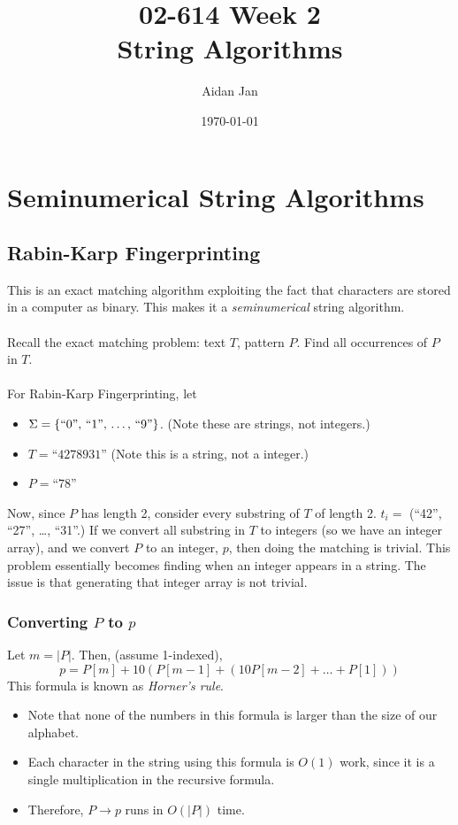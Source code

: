 \documentclass[10pt]{article}
\title{02-614 Week 2 \\ \large{String Algorithms}}
\author{Aidan Jan}
\date{\today}
\begin{document}
\maketitle

\section*{Seminumerical String Algorithms}
\subsection*{Rabin-Karp Fingerprinting}
This is an exact matching algorithm exploiting the fact that characters are stored in a computer as binary.  This makes it a \textit{seminumerical} string algorithm.\\\\
Recall the exact matching problem: text $T$, pattern $P$.  Find all occurrences of $P$ in $T$.\\\\
For Rabin-Karp Fingerprinting, let
\begin{itemize}
	\item $\Sigma = \{\text{``0'', ``1'', \dots, ``9''}\}$.  (Note these are strings, not integers.)
	\item $T = \text{``4278931''}$  (Note this is a string, not a integer.)
	\item $P = \text{``78''}$
\end{itemize}
Now, since $P$ has length 2, consider every substring of $T$ of length 2.  $t_i=$ (``42'', ``27'', \dots, ``31''.)  If we convert all substring in $T$ to integers (so we have an integer array), and we convert $P$ to an integer, $p$, then doing the matching is trivial.  This problem essentially becomes finding when an integer appears in a string.  The issue is that generating that integer array is not trivial.

\subsubsection*{Converting $P$ to $p$}
Let $m = |P|$.  Then, (assume 1-indexed),
\[p = P[m] + 10(P[m - 1] + (10P[m - 2] + \dots + P[1]))\]
This formula is known as \textit{Horner's rule}.
\begin{itemize}
	\item Note that none of the numbers in this formula is larger than the size of our alphabet.
	\item Each character in the string using this formula is $O(1)$ work, since it is a single multiplication in the recursive formula.
	\item Therefore, $P \rightarrow p$ runs in $O(|P|)$ time.
\end{itemize}
\end{document}
